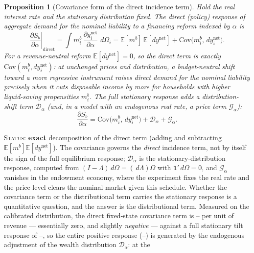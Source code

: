 \documentclass[12pt]{article}
\providecommand{\pendingnum}{\textit{--}}
\providecommand{\epsTilt}{\pendingnum}
\providecommand{\covTiltDirect}{\pendingnum}\providecommand{\covTiltShift}{\pendingnum}
\newtheorem{proposition}{Proposition}
\newcommand{\E}{\mathbb{E}}
\newcommand{\Cov}{\mathrm{Cov}}
\newcommand{\dd}{\,d}
\begin{document}
\begin{proposition}[Covariance form of the direct incidence term]\label{prop:covincidence}
Hold the real interest rate and the stationary distribution fixed. The
\emph{direct} (policy) response of aggregate demand for the nominal liability
to a financing reform indexed by $\alpha$ is
\begin{equation}
\left.\frac{\partial S_b}{\partial\alpha}\right|_{\text{direct}}
=\int m_i^b\,\frac{\partial y_i^{\mathrm{net}}}{\partial\alpha}\,\dd\Omega_i
=\E[m^b]\,\E[dy^{\mathrm{net}}]+\Cov\!\big(m_i^b,\,dy_i^{\mathrm{net}}\big).
\label{eq:covincidence}
\end{equation}
For a \emph{revenue-neutral} reform $\E[dy^{\mathrm{net}}]=0$, so the direct
term is exactly $\Cov(m_i^b,dy_i^{\mathrm{net}})$: at unchanged prices and
distribution, a budget-neutral shift toward a more regressive instrument
raises direct demand for the nominal liability precisely when it cuts
disposable income by more for households with higher liquid-saving
propensities $m_i^b$. The full stationary response adds a
distribution-shift term $\mathcal D_\alpha$ (and, in a model with an
endogenous real rate, a price term $\mathcal G_\alpha$):
\begin{equation}
\frac{\partial S_b}{\partial\alpha}
=\Cov\!\big(m_i^b,\,dy_i^{\mathrm{net}}\big)+\mathcal D_\alpha+\mathcal G_\alpha.
\label{eq:covfull}
\end{equation}
\end{proposition}
\noindent\textsc{Status:} \textbf{exact} decomposition of the direct term
(adding and subtracting $\E[m^b]\E[dy^{\mathrm{net}}]$). The covariance
governs the \emph{direct} incidence term, not by itself the sign of the full
equilibrium response; $\mathcal D_\alpha$ is the stationary-distribution
response, computed from $(I-\Lambda)\dd\Omega=(\dd\Lambda)\Omega$ with
$\mathbf 1'\dd\Omega=0$, and $\mathcal G_\alpha$ vanishes in the endowment
economy, where the experiment fixes the real rate and the price level clears
the nominal market given this schedule. Whether the covariance term or the
distributional term carries the stationary response is a quantitative
question, and the answer is the distributional term. Measured on the
calibrated distribution, the direct fixed-state covariance term is
$\covTiltDirect$ per unit of revenue --- essentially zero, and slightly
\emph{negative} --- against a full stationary tilt response of $\epsTilt$,
so the entire positive response ($\covTiltShift$) is generated by the
endogenous adjustment of the wealth distribution $\mathcal D_\alpha$: at the
\end{document}

